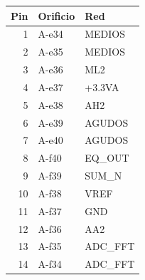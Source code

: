 \begin{tabular}{r l p{39mm}}
\toprule Pin & Orificio & Red\\\midrule
1 & A-e34 & MEDIOS\\
2 & A-e35 & MEDIOS\\
3 & A-e36 & ML2\\
4 & A-e37 & +3.3VA\\
5 & A-e38 & AH2\\
6 & A-e39 & AGUDOS\\
7 & A-e40 & AGUDOS\\
8 & A-f40 & EQ\_OUT\\
9 & A-f39 & SUM\_N\\
10 & A-f38 & VREF\\
11 & A-f37 & GND\\
12 & A-f36 & AA2\\
13 & A-f35 & ADC\_FFT\\
14 & A-f34 & ADC\_FFT\\
\bottomrule\end{tabular}
